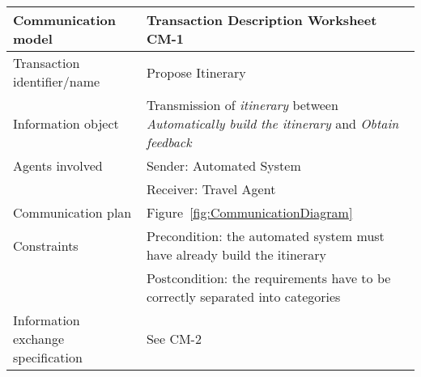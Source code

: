 \newline
\vspace{0.8 cm}
\newline
\noindent
\begin{tabular}%
		{|p{3cm}%
        |p{9cm}|}
\hline
{\bf Communication model} &
   {\bf Transaction Description Worksheet CM-1} \\
\hline
\hline
\sc Transaction identifier/name &
   {\rm Propose Itinerary } \\
\hline
\sc Information object &
   {\rm
   Transmission of \textit{itinerary} between \textit{Automatically build the itinerary} and \textit{Obtain feedback}
   } \\
\hline
\sc Agents involved &
	{\rm Sender: Automated System} \\
	& {\rm Receiver: Travel Agent}\\
\hline
\sc Communication plan &
   {\rm
   Figure~\ref{fig:CommunicationDiagram}
   } \\
\hline
\sc Constraints &
   {\rm Precondition: the automated system must have already build the itinerary}\\
	& {\rm Postcondition: the requirements have to be correctly separated into categories } \\
\hline
\sc Information exchange specification &
   {\rm
   See CM-2 
   } \\
\hline
\end{tabular}
